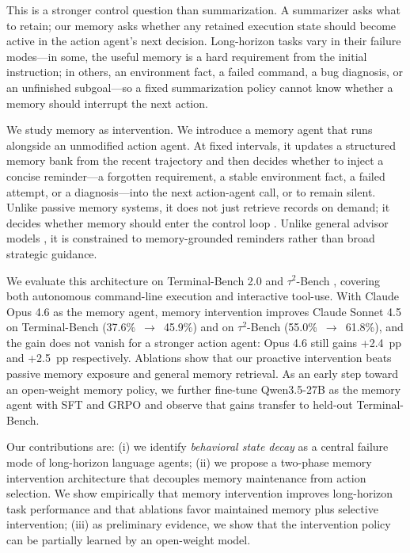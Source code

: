 This is a stronger control question than summarization. A summarizer asks what to retain; our memory asks whether any retained execution state should become active in the action agent's next decision. Long-horizon tasks vary in their failure modes---in some, the useful memory is a hard requirement from the initial instruction; in others, an environment fact, a failed command, a bug diagnosis, or an unfinished subgoal---so a fixed summarization policy cannot know whether a memory should interrupt the next action.

We study memory as intervention. We introduce a memory agent that runs alongside an unmodified action agent. At fixed intervals, it updates a structured memory bank from the recent trajectory and then decides whether to inject a concise reminder---a forgotten requirement, a stable environment fact, a failed attempt, or a diagnosis---into the next action-agent call, or to remain silent. Unlike passive memory systems, it does not just retrieve records on demand; it decides whether memory should enter the control loop \citep{zhang2025memact}. Unlike general advisor models \citep{asawa2025advisor,anthropic2026advisor}, it is constrained to memory-grounded reminders rather than broad strategic guidance.

We evaluate this architecture on Terminal-Bench 2.0 \citep{merrill2026terminalbench} and $\tau^2$-Bench \citep{yao2024taubench,barres2025tau2bench}, covering both autonomous command-line execution and interactive tool-use. With Claude Opus 4.6 as the memory agent, memory intervention improves Claude Sonnet 4.5 on Terminal-Bench (37.6\%~$\to$~45.9\%) and on $\tau^2$-Bench (55.0\%~$\to$~61.8\%), and the gain does not vanish for a stronger action agent: Opus 4.6 still gains +2.4~pp and +2.5~pp respectively. Ablations show that our proactive intervention beats passive memory exposure and general memory retrieval. As an early step toward an open-weight memory policy, we further fine-tune Qwen3.5-27B as the memory agent with SFT and GRPO and observe that gains transfer to held-out Terminal-Bench.

Our contributions are: (i) we identify \emph{behavioral state decay} as a central failure mode of long-horizon language agents; (ii) we propose a two-phase memory intervention architecture that decouples memory maintenance from action selection. We show empirically that memory intervention improves long-horizon task performance and that ablations favor maintained memory plus selective intervention; (iii) as preliminary evidence, we show that the intervention policy can be partially learned by an open-weight model.












